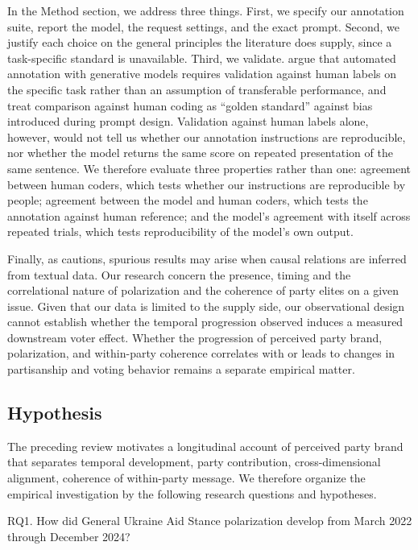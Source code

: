 In the Method section, we address three things. First, we specify our annotation suite, report the model, the request settings, and the exact prompt. Second, we justify each choice on the general principles the literature does supply, since a task-specific standard is unavailable. Third, we validate. \citet{pangakisAutomatedAnnotationGenerative2023} argue that automated annotation with generative models requires validation against human labels on the specific task rather than an assumption of transferable performance, and \citet{ornsteinHowTrainYour2025} treat comparison against human coding as ``golden standard'' against bias introduced during prompt design. Validation against human labels alone, however, would not tell us whether our annotation instructions are reproducible, nor whether the model returns the same score on repeated presentation of the same sentence. We therefore evaluate three properties rather than one: agreement between human coders, which tests whether our instructions are reproducible by people; agreement between the model and human coders, which tests the annotation against human reference; and the model's agreement with itself across repeated trials, which tests reproducibility of the model's own output.

Finally, as \citet{nemethScopingReviewUse2023} cautions, spurious results may arise when causal relations are inferred from textual data. Our research concern the presence, timing and the correlational nature of polarization and the coherence of party elites on a given issue. Given that our data is limited to the supply side, our observational design cannot establish whether the temporal progression observed induces a measured downstream voter effect. Whether the progression of perceived party brand, polarization, and within-party coherence correlates with or leads to changes in partisanship and voting behavior remains a separate empirical matter.

\subsection{Hypothesis}

The preceding review motivates a longitudinal account of perceived party brand that separates temporal development, party contribution, cross-dimensional alignment, coherence of within-party message. We therefore organize the empirical investigation by the following research questions and hypotheses.

RQ1. How did General Ukraine Aid Stance polarization develop from March 2022 through December 2024?

